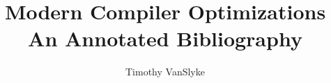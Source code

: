 \documentclass[12pt]{article}
\title{Modern Compiler Optimizations\\\medskip An Annotated Bibliography}
\author{Timothy VanSlyke}
\begin{document}
\maketitle
\nocite{*}


\end{document}
